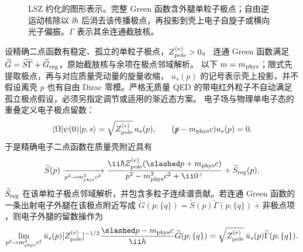 \begin{figure}[htbp]
 \centering
 
 \caption{LSZ 约化的图形表示。完整 Green 函数含外腿单粒子极点；自由逆运动核除以 $\ii\hbar$ 后消去该传播极点，再投影到壳上电子自旋子或横向光子偏振。$\Gamma$ 表示其余连通截肢核。}
 \label{fig:qed-lsz-amputation-dp8}
\end{figure}

\begin{proposition}
设精确二点函数有稳定、孤立的单粒子极点，$Z_{\rm pole}^{(e)}>0$。
连通 Green 函数满足 $\widetilde G=\widetilde S\widetilde\Gamma+\widetilde G_{\rm reg}$，原始截肢核与余项在极点邻域解析。
以下 $m=m_{\rm phys}$；限式先提取极点，再与对应质量壳动量的旋量收缩，
$u_s(p)$ 的记号表示壳上投影，并不假设离壳 $p$ 也有自由 Dirac 零模。严格无质量 QED 的带电红外粒子不自动满足孤立极点假设，必须另指定调节或适用的渐近态方案。
电子场与物理单电子态的重叠定义电子极点留数：
\begin{equation}
 {
 \langle\Omega|\psi(0)|p,s\rangle
 =\sqrt{Z_{\rm pole}^{(e)}}\,u_s(p),}
 \qquad
 (\slashed p-m_{\rm phys}c)u_s(p)=0.
 \label{eq:dirac-field-pole-overlap-dp8}
\end{equation}
于是精确电子二点函数在质量壳附近具有
\begin{equation}
 {
 \widetilde S(p)
 \xrightarrow[p^2\to m_{\rm phys}^2c^2]{}
 \frac{\ii\hbar Z_{\rm pole}^{(e)}(\slashed p+m_{\rm phys}c)}
 {p^2-m_{\rm phys}^2c^2+\ii0^+}
 +\widetilde S_{\rm reg}(p).}
 \label{eq:dirac-exact-pole-lsz-dp8}
\end{equation}
$\widetilde S_{\rm reg}$ 在该单粒子极点邻域解析，并包含多粒子连续谱贡献。若连通 Green 函数的一条出射电子外腿在该极点附近写成 $\widetilde G(p;\{q\})=\widetilde S(p)\widetilde\Gamma(p;\{q\})+\text{非极点项}$，则电子外腿的留数操作为
\begin{equation}
 {
 \lim_{p^2\to m_{\rm phys}^2c^2}
 \bar u_s(p)[Z_{\rm pole}^{(e)}]^{-1/2}
 \frac{\slashed p-m_{\rm phys}c}{\ii\hbar}
 \widetilde G(p;\{q\})
 =\sqrt{Z_{\rm pole}^{(e)}}\,\bar u_s(p)\widetilde\Gamma(p;\{q\}).}
 \label{eq:dirac-lsz-amputation-r68}
\end{equation}
\end{proposition}
